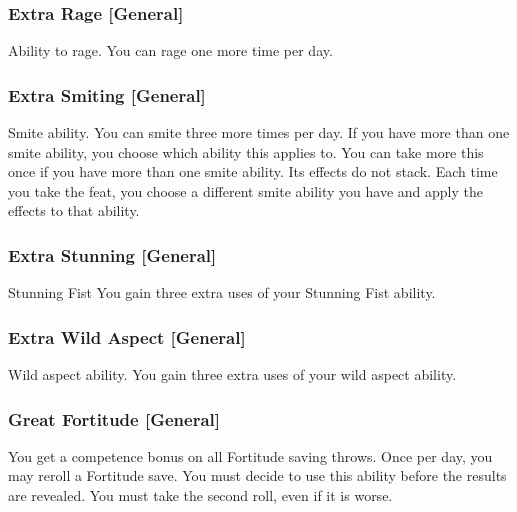 \subsubsection{Extra Rage [General]}
 Ability to rage.
 You can rage one more time per day.

\subsubsection{Extra Smiting [General]}
 Smite ability.
 You can smite three more times per day. If you have more than one smite ability, you choose which ability this applies to.
 You can take more this once if you have more than one smite ability. Its effects do not stack. Each time you take the feat, you choose a different smite ability you have and apply the effects to that ability.

\subsubsection{Extra Stunning [General]}
 Stunning Fist
 You gain three extra uses of your Stunning Fist ability.

\subsubsection{Extra Wild Aspect [General]}
 Wild aspect ability.
 You gain three extra uses of your wild aspect ability.

\subsubsection{Great Fortitude [General]}
 You get a  competence bonus on all Fortitude saving throws. Once per day, you may reroll a Fortitude save. You must decide to use this ability before the results are revealed. You must take the second roll, even if it is worse.


